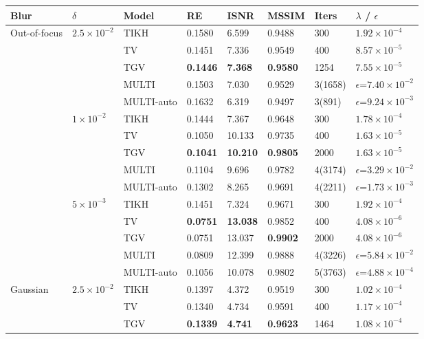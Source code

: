 \begin{tabular}{llllllll}
\toprule
Blur & $\delta$ & Model & RE & ISNR & MSSIM & Iters & $\lambda$ / $\epsilon$ \\
\midrule
\multirow{15}{*}{Out-of-focus} & \multirow{5}{*}{$2.5\times 10^{-2}$} & TIKH & 0.1580 & 6.599 & 0.9488 & 300 & $1.92\times 10^{-4}$ \\
 &  & TV & 0.1451 & 7.336 & 0.9549 & 400 & $8.57\times 10^{-5}$ \\
 &  & TGV & \textbf{0.1446} & \textbf{7.368} & \textbf{0.9580} & 1254 & $7.55\times 10^{-5}$ \\
 &  & MULTI & 0.1503 & 7.030 & 0.9529 & 3(1658) & $\epsilon$=$7.40\times 10^{-2}$ \\
 &  & MULTI-auto & 0.1632 & 6.319 & 0.9497 & 3(891) & $\epsilon$=$9.24\times 10^{-3}$ \\
\cmidrule{2-8}
 & \multirow{5}{*}{$1\times 10^{-2}$} & TIKH & 0.1444 & 7.367 & 0.9648 & 300 & $1.78\times 10^{-4}$ \\
 &  & TV & 0.1050 & 10.133 & 0.9735 & 400 & $1.63\times 10^{-5}$ \\
 &  & TGV & \textbf{0.1041} & \textbf{10.210} & \textbf{0.9805} & 2000 & $1.63\times 10^{-5}$ \\
 &  & MULTI & 0.1104 & 9.696 & 0.9782 & 4(3174) & $\epsilon$=$3.29\times 10^{-2}$ \\
 &  & MULTI-auto & 0.1302 & 8.265 & 0.9691 & 4(2211) & $\epsilon$=$1.73\times 10^{-3}$ \\
\cmidrule{2-8}
 & \multirow{5}{*}{$5\times 10^{-3}$} & TIKH & 0.1451 & 7.324 & 0.9671 & 300 & $1.92\times 10^{-4}$ \\
 &  & TV & \textbf{0.0751} & \textbf{13.038} & 0.9852 & 400 & $4.08\times 10^{-6}$ \\
 &  & TGV & 0.0751 & 13.037 & \textbf{0.9902} & 2000 & $4.08\times 10^{-6}$ \\
 &  & MULTI & 0.0809 & 12.399 & 0.9888 & 4(3226) & $\epsilon$=$5.84\times 10^{-2}$ \\
 &  & MULTI-auto & 0.1056 & 10.078 & 0.9802 & 5(3763) & $\epsilon$=$4.88\times 10^{-4}$ \\
\midrule
\multirow{15}{*}{Gaussian} & \multirow{5}{*}{$2.5\times 10^{-2}$} & TIKH & 0.1397 & 4.372 & 0.9519 & 300 & $1.02\times 10^{-4}$ \\
 &  & TV & 0.1340 & 4.734 & 0.9591 & 400 & $1.17\times 10^{-4}$ \\
 &  & TGV & \textbf{0.1339} & \textbf{4.741} & \textbf{0.9623} & 1464 & $1.08\times 10^{-4}$ \\

\end{tabular}
